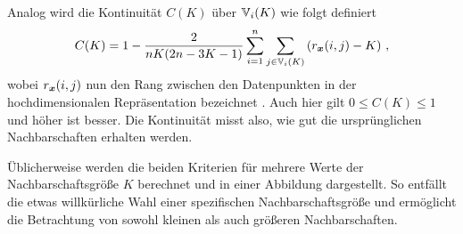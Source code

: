 Analog wird die Kontinuität $C(K)$ über $\mathbb{V}_i(K)$ wie folgt definiert
\begin{equation}
	C(K) = 1 - \frac{2}{nK(2n - 3K - 1)} \sum_{i = 1}^{n}\sum_{j \in \mathbb{V}_i(K) } \left( r_{\bm{x}}(i, j) - K \right) \, ,
\end{equation}
wobei $r_{\bm{x}}(i, j)$ nun den Rang zwischen den Datenpunkten in der hochdimensionalen Repräsentation bezeichnet \parencite[487]{Venna.2001}. Auch hier gilt $0 \leq C(K) \leq 1$ und höher ist besser. Die Kontinuität
misst also, wie gut die ursprünglichen Nachbarschaften erhalten werden.

Üblicherweise werden die beiden Kriterien für mehrere Werte der Nachbarschaftsgröße $K$ berechnet und in einer Abbildung dargestellt. So entfällt die etwas willkürliche Wahl einer spezifischen Nachbarschaftsgröße und ermöglicht die Betrachtung von sowohl kleinen als auch größeren Nachbarschaften.

